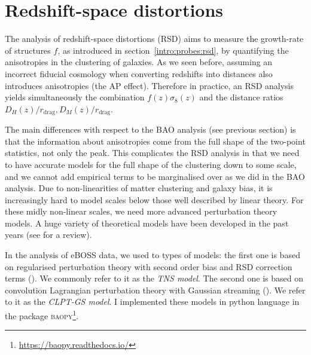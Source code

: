 \section{Redshift-space distortions}
\label{galaxies:rsd}

The analysis of redshift-space distortions (RSD) aims to measure the growth-rate of structures $f$, 
as introduced in section~\ref{intro:probes:rsd}, by quantifying the anisotropies in the clustering 
of galaxies. As we seen before, assuming an incorrect fiducial cosmology when converting redshifts 
into distances also introduces anisotropies (the AP effect). Therefore in practice, an RSD analysis
yields simultaneously the combination $f(z)\sigma_8(z)$ and the distance ratios $D_H(z)/r_\text{drag}, D_M(z)/r_\text{drag}$. 

The main differences with respect to the BAO analysis (see previous section) is that the information 
about anisotropies come from the full shape of the two-point statistics, not only the peak. 
This complicates the RSD analysis in that we need to have accurate models for the full shape of 
the clustering down to some scale, and we cannot add empirical terms to be marginalised over as we did in the BAO analysis. 
Due to non-linearities of matter clustering and galaxy bias, it is increasingly hard to model scales below 
those well described by linear theory. For these midly non-linear scales, we need more advanced perturbation theory models. 
A huge variety of theoretical models have been developed in the past years (see \cite{bernardeauLargeScaleStructureUniverse2002}
for a review). 

In the analysis of eBOSS data, we used to types of models: 
the first one is based on regularised perturbation theory with second order bias and RSD correction terms
(\cite{taruyaBaryonAcousticOscillations2010, taruyaDirectFastCalculation2012}). We commonly refer to it as 
the \emph{TNS model}. The second one is based on convolution Lagrangian perturbation theory with Gaussian streaming
(\cite{carlsonConvolutionLagrangianPerturbation2013, wangAnalyticModelRedshiftspace2014}). We refer to it as 
the \emph{CLPT-GS model}. I implemented these models in python language in the package 
\textsc{baopy}\footnote{\url{https://baopy.readthedocs.io/}}. 

